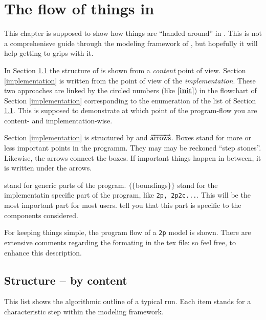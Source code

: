 
\newcommand{\nextline}{\par\phantom{a}\vspace*{0.1\textwidth}}
\chapter{The flow of things in \Dumux}
\label{flow}

This chapter is supposed to show how things are ``handed around'' in \Dumux. This is not a comprehenisve guide through the modeling framework of \Dumux, but hopefully it will help getting to grips with it. 

In Section \ref{content} the structure of \Dumux is shown from a \emph{content} point of view.
Section \ref{implementation} is written from the point of view of the \emph{implementation}. These two approaches are linked by the circled numbers (like \textbf{\textcircled{\ref{init}}}) in the flowchart of Section \ref{implementation} corresponding to the enumeration of the list of Section \ref{content}. This is supposed to demonstrate at which point of the program-flow you are content- and implementation-wise. 

Section \ref{implementation} is structured by  and $\overrightarrow{\textnormal{arrows}}$. Boxes stand for more or less important points in the programm. They may may be reckoned ``step stones''. Likewise, the arrows connect the boxes. If important things happen in between, it is written under the arrows.

 stand for generic parts of the program.  $\lbrace\lbrace$boundings$\rbrace\rbrace$ stand for the implementatin specific part of the program, like \verb+2p, 2p2c...+. This will be the most important part for most users.  tell you that this part is specific to the components considered. 

For keeping things simple, the program flow of a \verb+2p+ model is shown.
There are extensive comments regarding the formating in the tex file: so feel free, to enhance this description.

\section{Structure -- by content}
\label{content}
This list shows the algorithmic outline of a typical \Dumux run. Each item stands for a characteristic step within the modeling framework. 

